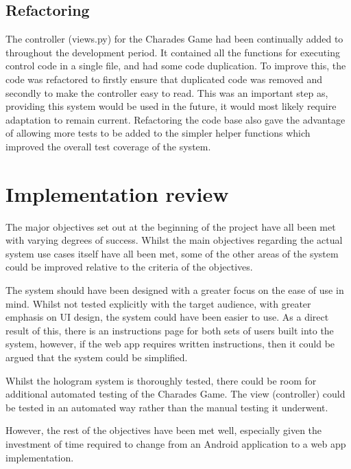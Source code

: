 \subsection{Refactoring}
The controller (views.py) for the Charades Game had been continually added to throughout the development period. It contained all the functions for executing control code in a single file, and had some code duplication. To improve this, the code was refactored to firstly ensure that duplicated code was removed and secondly to make the controller easy to read. This was an important step as, providing this system would be used in the future, it would most likely require adaptation to remain current. Refactoring the code base also gave the advantage of allowing more tests to be added to the simpler helper functions which improved the overall test coverage of the system.

\newpage

\section{Implementation review}
The major objectives set out at the beginning of the project have all been met with varying degrees of success. Whilst the main objectives regarding the actual system use cases itself have all been met, some of the other areas of the system could be improved relative to the criteria of the objectives. 

The system should have been designed with a greater focus on the ease of use in mind. Whilst not tested explicitly with the target audience, with greater emphasis on UI design, the system could have been easier to use. As a direct result of this, there is an instructions page for both sets of users built into the system, however, if the web app requires written instructions, then it could be argued that the system could be simplified.

Whilst the hologram system is thoroughly tested, there could be room for additional automated testing of the Charades Game. The view (controller) could be tested in an automated way rather than the manual testing it underwent.

However, the rest of the objectives have been met well, especially given the investment of time required to change from an Android application to a web app implementation.